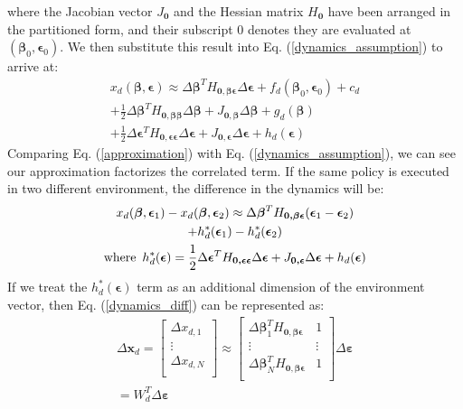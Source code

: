 where the Jacobian vector $J_{\bm{0}}$ and the Hessian matrix $H_{\bm{0}}$ have been arranged in the partitioned form, and their subscript 0 denotes they are evaluated at $(\bm{\beta}_0, \bm{\epsilon}_0)$.
We then substitute this result into Eq. (\ref{dynamics_assumption}) to arrive at:
\begin{equation}
\begin{gathered}
x_d(\bm{\beta}, \bm{\epsilon}) \approx
\Delta \bm{\beta}^T H_{\bm{0, \beta \epsilon}} \Delta \bm{\epsilon}
+ f_d(\bm{\beta}_0, \bm{\epsilon}_0) + c_d
\\ + 
\frac{1}{2} \Delta \bm{\beta}^T H_{\bm{0, \beta \beta}} \Delta \bm{\beta} 
+ J_{\bm{0, \beta}} \Delta \bm{\beta}
+ g_d(\bm{\beta}) 
\\
+ \frac{1}{2} \Delta \bm{\epsilon}^T H_{\bm{0, \epsilon \epsilon}} \Delta \bm{\epsilon}
+ J_{\bm{0, \epsilon}} \Delta \bm{\epsilon}
+ h_d(\bm{\epsilon}) 
\end{gathered}
\label{approximation}
\end{equation}
%
Comparing Eq. (\ref{approximation}) with Eq. (\ref{dynamics_assumption}), we can see our approximation factorizes the correlated term. If the same policy is executed in two different environment, the difference in the dynamics will be:
\begin{equation}
\begin{gathered}
x_d(\bm{\beta}, \bm{\epsilon}_1) - 
x_d(\bm{\beta}, \bm{\epsilon}_2) \approx
\Delta \bm{\beta}^T H_{\bm{0, \beta \epsilon}} 
(\bm{\epsilon}_1 - \bm{\epsilon}_2)
\\
+ h^*_d(\bm{\epsilon}_1) - h^*_d(\bm{\epsilon}_2) 
\\
\text{where \,}
h^*_d(\bm{\epsilon}) = 
\frac{1}{2} \Delta \bm{\epsilon}^T H_{\bm{0, \epsilon \epsilon}} \Delta \bm{\epsilon}
+ J_{\bm{0, \epsilon}} \Delta \bm{\epsilon}
+ h_d(\bm{\epsilon}) 
\end{gathered}
\label{dynamics_diff}
\end{equation}
If we treat the $h^*_d(\bm{\epsilon})$ term as an additional dimension of the environment vector, then Eq. (\ref{dynamics_diff}) can be represented as:
\begin{equation}
\begin{gathered}
\Delta \bm{x}_d = 
\begin{bmatrix}
\Delta x_{d, 1} \\
\vdots \\
\Delta x_{d, N} \\
\end{bmatrix}
\approx
\begin{bmatrix}
\Delta \bm{\beta}_1^T H_{\bm{0, \beta \epsilon}} & 1 \\
\vdots & \vdots \\
\Delta \bm{\beta}_N^T H_{\bm{0, \beta \epsilon}} & 1 \\
\end{bmatrix}
\Delta \bm{\varepsilon} 
\\
= W_{d}^T \Delta \bm{\varepsilon}
\end{gathered}
\label{linear_form}
\end{equation}
